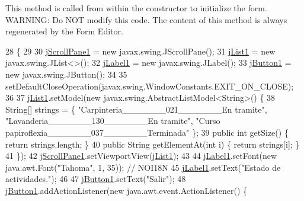 This method is called from within the constructor to initialize the form. W\+A\+R\+N\+I\+NG\+: Do N\+OT modify this code. The content of this method is always regenerated by the Form Editor. 
\begin{DoxyCode}
28                                   \{
29 
30         \mbox{\hyperlink{classsoftware_1_1parasoftware5_a6f96f0532db133badaa13805011edbbf}{jScrollPane1}} = \textcolor{keyword}{new} javax.swing.JScrollPane();
31         \mbox{\hyperlink{classsoftware_1_1parasoftware5_a8aaa4631814597b59a824b075c3add82}{jList1}} = \textcolor{keyword}{new} javax.swing.JList<>();
32         \mbox{\hyperlink{classsoftware_1_1parasoftware5_af4b23e74de14b990bb7d45f82d6f6e99}{jLabel1}} = \textcolor{keyword}{new} javax.swing.JLabel();
33         \mbox{\hyperlink{classsoftware_1_1parasoftware5_ab414e05e8b6d539af83f7c8f6c77f61f}{jButton1}} = \textcolor{keyword}{new} javax.swing.JButton();
34 
35         setDefaultCloseOperation(javax.swing.WindowConstants.EXIT\_ON\_CLOSE);
36 
37         \mbox{\hyperlink{classsoftware_1_1parasoftware5_a8aaa4631814597b59a824b075c3add82}{jList1}}.setModel(\textcolor{keyword}{new} javax.swing.AbstractListModel<String>() \{
38             String[] strings = \{ \textcolor{stringliteral}{"Carpinteria\_\_\_\_\_\_\_021\_\_\_\_\_\_\_En tramite"}, \textcolor{stringliteral}{"Lavanderia\_\_\_\_\_\_\_130\_\_\_\_\_\_\_En
       tramite"}, \textcolor{stringliteral}{"Curso papiroflexia\_\_\_\_\_\_\_037\_\_\_\_\_\_\_Terminada"} \};
39             \textcolor{keyword}{public} \textcolor{keywordtype}{int} getSize() \{ \textcolor{keywordflow}{return} strings.length; \}
40             \textcolor{keyword}{public} String getElementAt(\textcolor{keywordtype}{int} i) \{ \textcolor{keywordflow}{return} strings[i]; \}
41         \});
42         \mbox{\hyperlink{classsoftware_1_1parasoftware5_a6f96f0532db133badaa13805011edbbf}{jScrollPane1}}.setViewportView(\mbox{\hyperlink{classsoftware_1_1parasoftware5_a8aaa4631814597b59a824b075c3add82}{jList1}});
43 
44         \mbox{\hyperlink{classsoftware_1_1parasoftware5_af4b23e74de14b990bb7d45f82d6f6e99}{jLabel1}}.setFont(\textcolor{keyword}{new} java.awt.Font(\textcolor{stringliteral}{"Tahoma"}, 1, 35)); \textcolor{comment}{// NOI18N}
45         \mbox{\hyperlink{classsoftware_1_1parasoftware5_af4b23e74de14b990bb7d45f82d6f6e99}{jLabel1}}.setText(\textcolor{stringliteral}{"Estado de actividades."});
46 
47         \mbox{\hyperlink{classsoftware_1_1parasoftware5_ab414e05e8b6d539af83f7c8f6c77f61f}{jButton1}}.setText(\textcolor{stringliteral}{"Salir"});
48         \mbox{\hyperlink{classsoftware_1_1parasoftware5_ab414e05e8b6d539af83f7c8f6c77f61f}{jButton1}}.addActionListener(\textcolor{keyword}{new} java.awt.event.ActionListener() \{

\end{DoxyCode}
